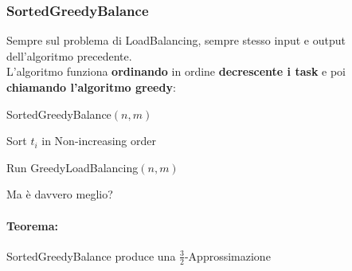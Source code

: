 \documentclass[11pt]{article}
\begin{document}
	\subsubsection{SortedGreedyBalance}
	Sempre sul problema di LoadBalancing, sempre stesso input e output dell'algoritmo precedente.\\
	
	L'algoritmo funziona \textbf{ordinando} in ordine \textbf{decrescente i task} e poi \textbf{chiamando l'algoritmo greedy}:
	
	\begin{algorithm}
		\caption{SortedGreedyBalance$(n, m)$}
		\begin{algorithmic}
			\STATE Sort $t_i$ in Non-increasing order
			\item Run GreedyLoadBalancing$(n,m)$
		\end{algorithmic}
	\end{algorithm}
	
	Ma è davvero meglio? \\
	
	\paragraph{Teorema:} SortedGreedyBalance produce una $\frac{3}{2}$-Approssimazione
	
\end{document}
